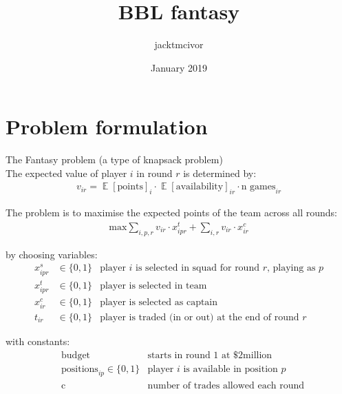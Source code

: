 \documentclass[10pt]{article}
\title{BBL fantasy}
\author{jacktmcivor }
\date{January 2019}
\DeclareMathOperator{\E}{\mathbb{E}}
\begin{document}
\section{Problem formulation}
The Fantasy problem (a type of knapsack problem)\\

The expected value of player $i$ in round $r$ is determined by:
\begin{align*}
    v_{ir} = \E[\text{points}]_i \cdot \E[\text{availability}]_{ir} \cdot \text{n games}_{ir}
\end{align*}


The problem is to maximise the expected points of the team across all rounds:
\begin{align*}
    \text{max} \sum_{i,p,r} v_{ir} \cdot x^t_{ipr} + \sum_{i,r} v_{ir} \cdot x^c_{ir}
\end{align*}

by choosing variables:
\begin{align*}
    x^s_{ipr} &\in \{0, 1\} &\text{player $i$ is selected in squad for round $r$, playing as $p$}\\
    x^t_{ipr} &\in \{0, 1\} &\text{player is selected in team}\\
    x^c_{ir} &\in \{0, 1\} &\text{player is selected as captain}\\
    t_{ir} &\in \{0, 1\} &\text{player is traded (in or out) at the end of round $r$}
\end{align*}

with constants:
\begin{align*}
    &\text{budget} &\text{starts in round 1 at \$2million}\\
    &\text{positions}_{ip} \in \{0, 1\} &\text{player $i$ is available in position $p$}\\
    &\text{c} &\text{number of trades allowed each round}\\
\end{align*}
\end{document}
